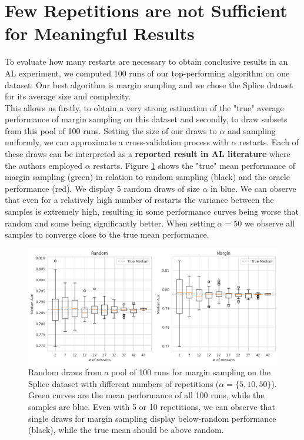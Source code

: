 \documentclass[]{article}
\begin{document}
\section{Few Repetitions are not Sufficient for Meaningful Results}\label{sec:restarts}
To evaluate how many restarts are necessary to obtain conclusive results in an AL experiment, we computed 100 runs of our top-performing algorithm on one dataset.
Our best algorithm is margin sampling and we chose the Splice dataset for its average size and complexity. \\
This allows us firstly, to obtain a very strong estimation of the "true" average performance of margin sampling on this dataset and secondly, to draw subsets from this pool of 100 runs.
Setting the size of our draws to $\alpha$ and sampling uniformly, we can approximate a cross-validation process with $\alpha$ restarts.
Each of these draws can be interpreted as a \textbf{reported result in AL literature} where the authors employed $\alpha$ restarts.
Figure \ref{fig:restarts} shows the "true" mean performance of margin sampling (green) in relation to random sampling (black) and the oracle performance (red).
We display 5 random draws of size $\alpha$ in blue.
We can observe that even for a relatively high number of restarts the variance between the samples is extremely high, resulting in some performance curves being worse that random and some being significantly better.
When setting $\alpha = 50$ we observe all samples to converge close to the true mean performance. 
\begin{figure}
        \hspace{-20mm}
	\includegraphics[width=1.24\linewidth]{img/ablation_restarts}
	\caption{Random draws from a pool of 100 runs for margin sampling on the Splice dataset with different numbers of repetitions ($\alpha=\{5,10,50\}$). Green curves are the mean performance of all 100 runs, while the samples are blue. Even with 5 or 10 repetitions, we can observe that single draws for margin sampling display below-random performance (black), while the true mean should be above random.}
	\label{fig:restarts}
\end{figure}
\end{document}
